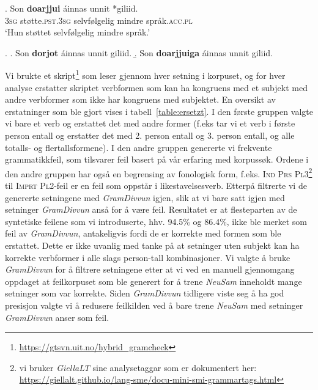 \documentclass{flammie}
\begin{document}
\exg. Son \textbf{doarjjui} áinnas unnit *giliid.\label{doarjjui1}\\
\textsc{3sg} støtte\textsc{.pst.3sg} selvfølgelig mindre språk\textsc{.acc.pl}\\
`Hun støttet selvfølgelig mindre språk.'

\ex. \label{doarjjui2}
\a. Son \textbf{dorjot} áinnas unnit giliid.
\b. Son \textbf{doarjjuiga} áinnas unnit giliid.



Vi brukte et skript\footnote{\url{https://gtsvn.uit.no/hybrid_gramcheck}} som
leser gjennom hver setning i korpuset, og for hver analyse erstatter skriptet
verbformen som kan ha kongruens med et subjekt med andre verbformer som ikke har
kongruens med subjektet. En oversikt av erstatninger som ble gjort vises i
tabell~\ref{table:ersetzt}.  I den første gruppen valgte vi bare et verb og
erstattet det med andre former (f.eks tar vi et verb i første person entall og
erstatter det med 2. person entall og 3. person entall, og alle totalls- og
flertallsformene). I den andre gruppen genererte vi frekvente  grammatikkfeil,
som tilsvarer feil basert på vår erfaring med korpussøk.  Ordene i den andre
gruppen har også en begrensing av fonologisk form, f.eks. \textsc{Ind Prs
Pl3}\footnote{vi bruker \textit{GiellaLT} sine analysetaggar som er dokumentert
her: \url{https://giellalt.github.io/lang-sme/docu-mini-smi-grammartags.html}}
til \textsc{Imprt Pl2}-feil er en feil som oppstår i likestavelsesverb.  Etterpå
filtrerte vi de genererte setningene med \textit{GramDivvun} igjen, slik at vi
bare satt igjen med setninger \textit{GramDivvun} anså for å være feil.
Resultatet er at flesteparten av de syntetiske feilene som vi introduserte, hhv.
94.5\% og 86.4\%, ikke ble merket som feil av \textit{GramDivvun}, antakeligvis
fordi de er korrekte med formen som ble erstattet. Dette er ikke uvanlig med
tanke på at setninger uten subjekt kan ha korrekte verbformer i alle slags
person-tall kombinasjoner. Vi valgte å bruke \textit{GramDivvun} for å filtrere
setningene etter at vi ved en manuell gjennomgang oppdaget at feilkorpuset som
ble generert for å trene \textit{NeuSam} inneholdt mange setninger som var
korrekte. Siden \textit{GramDivvun} tidligere viste seg å ha god presisjon
valgte vi å redusere feilkilden ved å bare trene \textit{NeuSam} med setninger
\textit{GramDivvun} anser som feil.
\end{document}
